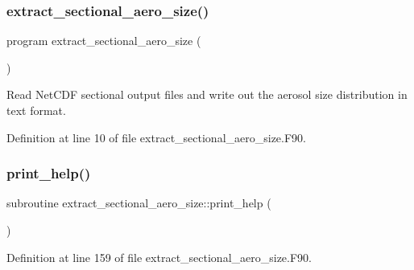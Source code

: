 \subsubsection{\texorpdfstring{extract\+\_\+sectional\+\_\+aero\+\_\+size()}{extract\_sectional\_aero\_size()}}
{\footnotesize\ttfamily program extract\+\_\+sectional\+\_\+aero\+\_\+size (\begin{DoxyParamCaption}{ }\end{DoxyParamCaption})}



Read Net\+C\+DF sectional output files and write out the aerosol size distribution in text format. 



Definition at line 10 of file extract\+\_\+sectional\+\_\+aero\+\_\+size.\+F90.

\mbox{\label{extract__sectional__aero__size_8_f90_afec0dfe781572b1d5e8bb53a27d5ae70}} 
\subsubsection{\texorpdfstring{print\+\_\+help()}{print\_help()}}
{\footnotesize\ttfamily subroutine extract\+\_\+sectional\+\_\+aero\+\_\+size\+::print\+\_\+help (\begin{DoxyParamCaption}{ }\end{DoxyParamCaption})}



Definition at line 159 of file extract\+\_\+sectional\+\_\+aero\+\_\+size.\+F90.

